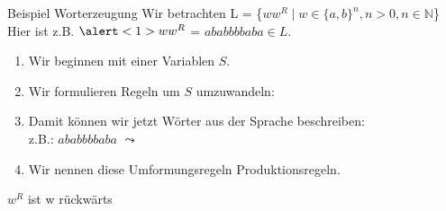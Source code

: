 \begin{frame}[fragile]{Beispiel Worterzeugung}
    \small{Wir betrachten L = \{$ww^R \mid w \in \{a, b\}^n, n>0, n\in \mathbb{N}$\}\\
    Hier ist z.B. $\alert<1>{w}w^R$ = \alert<1>{$ababb$}$bbaba\in L$.}\\
    \begin{enumerate}
    \item <2-> 
            \alert<2,5|handout:0>{Wir beginnen mit einer Variablen $S$.}
    \item <3-> 
            \alert<3|handout:0>{Wir formulieren Regeln um $S$ umzuwandeln:}
            \alert<4|handout:0>{}\vspace{-0.3in}
    \item <5->
            \alert<5|handout:0>{Damit können wir jetzt Wörter aus der Sprache beschreiben:}\\
            z.B.: \alert<6|handout:0>{$a$}\alert<7|handout:0>{$b$}\alert<8|handout:0>{$a$}\alert<9|handout:0>{$b$}\alert<10|handout:0>{$bb$}\alert<9|handout:0>{$b$}\alert<8|handout:0>{$a$}\alert<7|handout:0>{$b$}\alert<6|handout:0>{$a$} 
            $\leadsto$ 
    \item <11> \alert<11|handout:0>{Wir nennen diese Umformungsregeln Produktionsregeln.}
    \end{enumerate}
    \vspace{1cm}
    \footnotesize{$w^R$ ist w rückwärts}
\end{frame}

